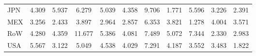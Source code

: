 \begin{table}[htbp]
\begin{tabular}{lcccccccccc}
  JPN & \textcolor[RGB]{107,69,148}{4.309} & \textcolor[RGB]{64,41,191}{5.937} & \textcolor[RGB]{59,38,196}{6.279} & \textcolor[RGB]{94,61,161}{5.039} & \textcolor[RGB]{105,68,150}{4.358} & \textcolor[RGB]{20,13,235}{9.706} & \textcolor[RGB]{237,153,18}{1.771} & \textcolor[RGB]{77,50,178}{5.596} & \textcolor[RGB]{173,112,82}{3.226} & \textcolor[RGB]{227,147,28}{2.391} \\ 
  MEX & \textcolor[RGB]{171,111,84}{3.256} & \textcolor[RGB]{224,145,31}{2.433} & \textcolor[RGB]{135,87,120}{3.897} & \textcolor[RGB]{196,127,59}{2.964} & \textcolor[RGB]{212,137,43}{2.857} & \textcolor[RGB]{56,36,199}{6.353} & \textcolor[RGB]{138,89,117}{3.821} & \textcolor[RGB]{250,162,5}{1.278} & \textcolor[RGB]{130,84,125}{4.004} & \textcolor[RGB]{153,99,102}{3.571} \\ 
  RoW & \textcolor[RGB]{110,71,145}{4.280} & \textcolor[RGB]{102,66,153}{4.359} & \textcolor[RGB]{18,12,237}{11.677} & \textcolor[RGB]{82,53,173}{5.386} & \textcolor[RGB]{120,78,135}{4.081} & \textcolor[RGB]{28,18,227}{7.489} & \textcolor[RGB]{89,58,166}{5.072} & \textcolor[RGB]{33,21,222}{7.344} & \textcolor[RGB]{230,148,26}{2.330} & \textcolor[RGB]{194,125,61}{2.983} \\ 
  USA & \textcolor[RGB]{79,51,176}{5.567} & \textcolor[RGB]{176,114,79}{3.122} & \textcolor[RGB]{92,59,163}{5.049} & \textcolor[RGB]{99,64,156}{4.538} & \textcolor[RGB]{125,81,130}{4.029} & \textcolor[RGB]{36,23,219}{7.291} & \textcolor[RGB]{112,73,143}{4.187} & \textcolor[RGB]{156,101,99}{3.552} & \textcolor[RGB]{161,104,94}{3.483} & \textcolor[RGB]{235,152,20}{1.822} \\ 
   \hline
\end{tabular}
\end{table}
